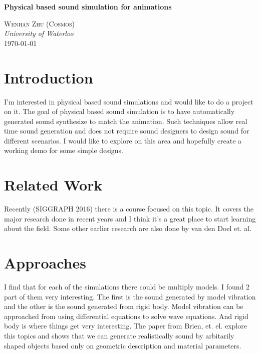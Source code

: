 \documentclass[11pt]{article}
\renewcommand{\maketitle}{
    \begin{flushright}
        {\LARGE \textbf{Physical based sound simulation for animations}}


    {\large \textsc{Wenhan Zhu (Cosmos)} \\ \textit{University of Waterloo}}
    \\ \today

    \end{flushright}
}
\begin{document}
\maketitle

\section*{Introduction}
I'm interested in physical based sound simulations and would like to do a project on it. The goal of physical based sound simulation is to have automatically generated sound synthesize to match the animation. Such techniques allow real time sound generation and does not require sound designers to design sound for different scenarios. I would like to explore on this area and hopefully create a working demo for some simple designs.

\section*{Related Work}
Recently (SIGGRAPH 2016) there is a course focused on this topic.\cite{James2016} It covers the major research done in recent years and I think it's a great place to start learning about the field. Some other earlier research are also done by van den Doel et. al.\cite{Doel2001}

\section*{Approaches}
I find that for each of the simulations there could be multiply models. I found 2 part of them very interesting. The first is the sound generated by model vibration and the other is the sound generated from rigid body. Model vibration can be approached from using differential equations to solve wave equations. And rigid body is where things get very interesting. The paper from Brien, et. el. \cite{Brien2002} explore this topics and shows that we can generate realistically sound by arbitarily shaped objects based only on geometric description and material parameters. 










\end{document}
